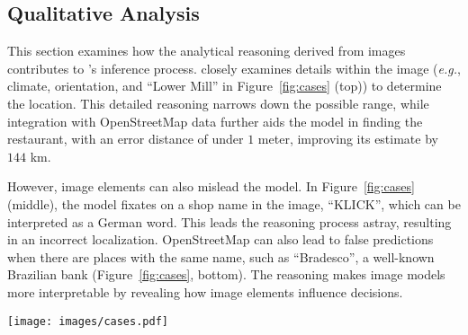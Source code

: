 \subsection{Qualitative Analysis}
\label{sec:qualitative_analysis}

This section examines how the analytical reasoning derived from images contributes to \modelname’s inference process. \modelname closely examines details within the image (\textit{e.g.}, climate, orientation, and ``Lower Mill'' in Figure~\ref{fig:cases} (top)) to determine the location. This detailed reasoning narrows down the possible range, while integration with OpenStreetMap data further aids the model in finding the restaurant, with an error distance of under $1$ meter, improving its estimate by $144$ km.

However, image elements can also mislead the model. In Figure~\ref{fig:cases} (middle), the model fixates on a shop name in the image, ``KLICK'', which can be interpreted as a German word. This leads the reasoning process astray, resulting in an incorrect localization. OpenStreetMap can also lead to false predictions when there are places with the same name, such as ``Bradesco'', a well-known Brazilian bank (Figure~\ref{fig:cases}, bottom). The reasoning makes image \geoloc models more interpretable by revealing how image elements influence decisions.

\begin{figure*}[t!]
    \centering
    \texttt{[image: images/cases.pdf]} 
    \caption{\textbf{Top:} The model uses visual details and OpenStreetMap to accurately determine the location. \textbf{Middle:} The model is misled by linguistic elements---the shop name, resulting in an incorrect inference. \textbf{Bottom:} The model found a namesake when using OpenStreetMap.}
    \label{fig:cases}
\end{figure*}